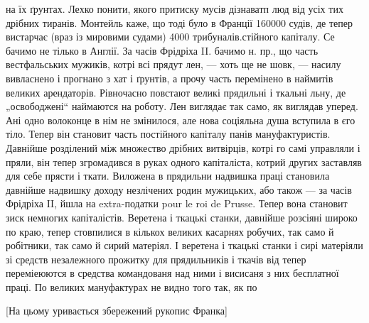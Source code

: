 на їх ґрунтах. Лехко понити, якого притиску мусів дізнаватп люд від
усіх тих дрібних тиранів. Монтейль каже, що тоді було в Франції 160000
судів, де тепер вистарчає (враз із мировими судами) 4000 трибуналів.стійного капіталу. Се бачимо не тілько в Англії. За часів
Фрідріха II. бачимо н. пр., що часть вестфальських мужиків,
котрі всі прядут лен, — хоть ще не шовк, — насилу
вивласнено і прогнано з хат і ґрунтів, а прочу часть перемінено
в наймитів великих арендаторів. Рівночасно повстают
великі прядильні і ткальні льну, де „освободжені“ наймаются
на роботу. Лен виглядає так само, як виглядав уперед.
Ані одно волоконце в нім не змінилося, але нова соціяльна
душа вступила в єго тіло. Тепер він становит часть постійного
капіталу панів мануфактуристів. Давнійше розділений
між множество дрібних витвірців, котрі го самі управляли
і пряли, він тепер згромадився в руках одного капіталіста,
котрий других заставляв для себе прясти і ткати. Виложена
в прядильни надвишка праці становила давнійше надвишку
доходу незлічених родин мужицьких, або також — за часів
Фрідріха II, йшла на extra-податки pour le roi de Prusse.
Тепер вона становит зиск немногих капіталістів. Веретена
і ткацькі станки, давнійше розсіяні широко по краю, тепер
стовпилися в кількох великих касарнях робучих, так само
й робітники, так само й сирий матеріял. І веретена і ткацькі
станки і сирі матеріяли зі средств незалежного прожитку
для прядильників і ткачів від тепер переміеюются в средства
командованя над ними і висисаня з них бесплатної
праці. По великих мануфактурах не видно того так, як по

[На цьому уривається збережений рукопис Франка]
